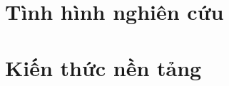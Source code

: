 \documentclass[../main-report.tex]{subfiles}
\begin{document}
\section{Tình hình nghiên cứu}

\section{Kiến thức nền tảng}
\end{document}
